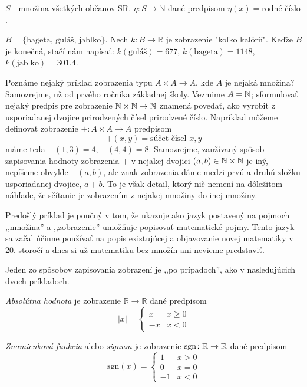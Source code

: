 \begin{example}
$S$ - množina všetkých občanov SR.
$\eta \colon S \rightarrow \mathbb{N}$ dané predpisom $\eta(x) = \text{rodné číslo}$.
\end{example}

\begin{example}
$B = \{\text{bageta, guláš, jablko}\}$. Nech $k \colon B \rightarrow \mathbb{R}$ je zobrazenie "koľko kalórií".
Keďže $B$ je konečná, stačí nám napísať:
$k(\text{guláš}) = 677$, $k(\text{bageta}) = 1148$, $k(\text{jablko}) = 301.4$.
\end{example}

\begin{example}
Poznáme nejaký príklad zobrazenia typu $A\times A\to A$, kde $A$ je nejaká množina? Samozrejme, už od prvého ročníka
základnej školy. Vezmime $A=\mathbb{N}$; sformulovať nejaký predpis pre zobrazenie 
$\mathbb{N}\times\mathbb{N}\to\mathbb{N}$ znamená povedať, ako vyrobiť z usporiadanej dvojice prirodzených čísel prirodzené
číslo. Napríklad môžeme definovať zobrazenie $+\colon A\times A\to A$ predpisom
\[
+(x,y)=\text{súčet čísel $x,y$}
\]
máme teda $+(1,3)=4$, $+(4,4)=8$. Samozrejme, zaužívaný spôsob zapisovania hodnoty zobrazenia $+$ v nejakej dvojici
$(a,b)\in\mathbb{N}\times\mathbb{N}$ je iný, nepíšeme obvykle $+(a,b)$, ale znak zobrazenia dáme medzi prvú a druhú zložku
usporiadanej dvojice, $a+b$. To je však detail, ktorý nič nemení na dôležitom náhľade, že sčítanie je zobrazením
z nejakej množiny do inej množiny.
\end{example}

Predošlý príklad je poučný v tom, že ukazuje ako jazyk postavený na pojmoch ,,množina'' a ,,zobrazenie'' umožňuje
popisovať matematické pojmy. Tento jazyk sa začal účinne používať na popis existujúcej a objavovanie novej matematiky v
20. storočí a dnes si už matematiku bez množín ani nevieme predstaviť.

Jeden zo spôsobov zapisovania zobrazení je ,,po prípadoch'', ako v nasledujúcich
dvoch príkladoch.
\begin{example}
\emph{Absolútna hodnota} je zobrazenie $\mathbb R\to\mathbb R$ dané predpisom
\[
|x|=
\begin{cases}
x& x\geq 0\\
-x& x<0
\end{cases}
\]
\end{example}
\begin{example}
\emph{Znamienková funkcia} alebo \emph{signum} je zobrazenie 
$\mathrm{sgn}\colon\mathbb{R}\to\mathbb{R}$ dané predpisom
\[
\mathrm{sgn}(x)=
\begin{cases}
1& x>0\\
0& x=0\\
-1& x<0
\end{cases}
\]
\end{example}

